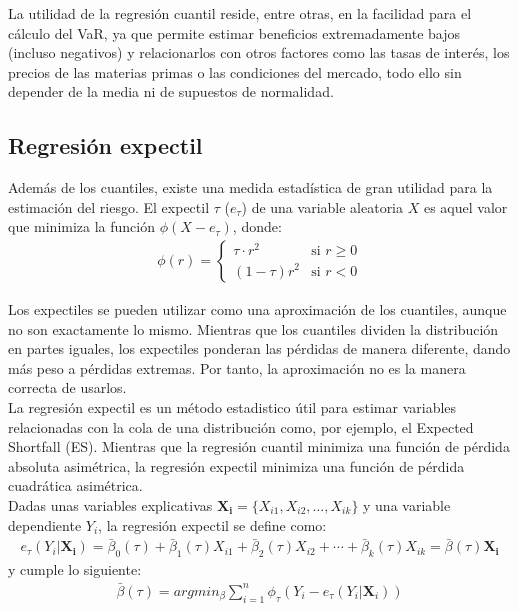 \documentclass[11pt]{book}
\theoremstyle{plain} %
\theoremstyle{definition} %
\begin{document}
La utilidad de la regresión cuantil reside, entre otras, en la facilidad para 
el cálculo del VaR, ya que permite estimar beneficios extremadamente bajos 
(incluso negativos) y relacionarlos con otros factores como las tasas de interés,
los precios de las materias primas o las condiciones del mercado, todo ello 
sin depender de la media ni de supuestos de normalidad.


\subsection{Regresión expectil}
Además de los cuantiles, existe una medida estadística de gran utilidad 
para la estimación del riesgo. El expectil $\tau$ ($e_\tau$) de una variable 
aleatoria $X$ es aquel valor que minimiza la función $\phi(X-e_\tau)$, donde:
\begin{align*}
   \phi(r) = 
   \begin{cases}
         \tau \cdot  r^2 & \text{si } r \ge 0 \\
         (1 - \tau)r^2 & \text{si } r < 0
   \end{cases}
\end{align*}

Los expectiles se pueden utilizar como una aproximación de los cuantiles, 
aunque no son exactamente lo mismo. Mientras que los cuantiles dividen la
distribución en partes iguales, los expectiles ponderan las pérdidas de manera
diferente, dando más peso a pérdidas extremas. Por tanto, la aproximación 
no es la manera correcta de usarlos. \\

La regresión expectil es un método estadistico útil para estimar variables 
relacionadas con la cola de una distribución como, por ejemplo, 
el Expected Shortfall (ES). 
Mientras que la regresión cuantil minimiza una función de pérdida absoluta 
asimétrica, la regresión expectil minimiza una función de pérdida cuadrática 
asimétrica.\\

Dadas unas variables explicativas $\mathbf{X_i} = \{X_{i1}, X_{i2}, \dots, X_{ik}\}$ y 
una variable dependiente $Y_i$, la regresión expectil se define como:
\begin{align*}
    e_\tau(Y_i|\mathbf{X_i})= \bar{\beta}_{0}(\tau)+ \bar{\beta}_{1}(\tau)X_{i1}+ \bar{\beta}_{2}(\tau)X_{i2}+\cdots +  \bar{\beta}_{k}(\tau)X_{ik} = \bar{\beta}(\tau)  \mathbf{X_i}
\end{align*}
y cumple lo siguiente:
\begin{align*}
    \bar{\beta}(\tau) = argmin_{\beta}\sum_{i=1}^n\phi_{\tau}(Y_i-e_{\tau}(Y_i|\mathbf{X}_i))
\end{align*}
\end{document}
